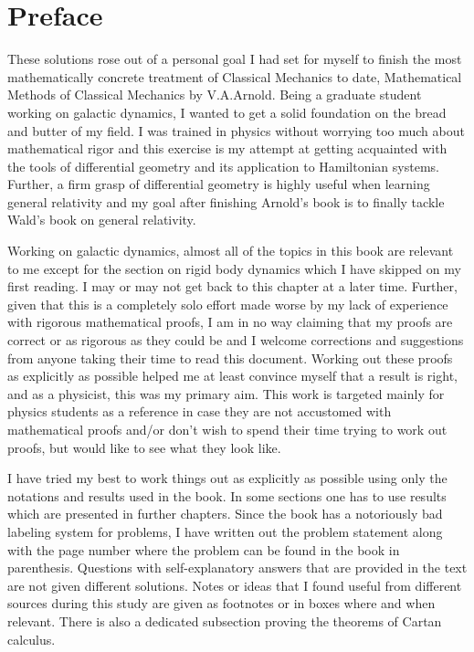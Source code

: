 \chapter*{Preface}
These solutions rose out of a personal goal I had set for myself to finish the most mathematically concrete treatment of Classical Mechanics to date, Mathematical Methods of Classical Mechanics by V.A.Arnold. Being a graduate student working on galactic dynamics, I wanted to get a solid foundation on the bread and butter of my field. I was trained in physics without worrying too much about mathematical rigor and this exercise is my attempt at getting acquainted with the tools of differential geometry and its application to Hamiltonian systems. Further, a firm grasp of differential geometry is highly useful when learning general relativity and my goal after finishing Arnold's book is to finally tackle Wald's book on general relativity.\par
Working on galactic dynamics, almost all of the topics in this book are relevant to me except for the section on rigid body dynamics which I have skipped on my first reading. I may or may not get back to this chapter at a later time. Further, given that this is a completely solo effort made worse by my lack of experience with rigorous mathematical proofs, I am in no way claiming that my proofs are correct or as rigorous as they could be and I welcome corrections and suggestions from anyone taking their time to read this document. Working out these proofs as explicitly as possible helped me at least convince myself that a result is right, and as a physicist, this was my primary aim. This work is targeted mainly for physics students as a reference in case they are not accustomed with mathematical proofs and/or don't wish to spend their time trying to work out proofs, but would like to see what they look like.\par
I have tried my best to work things out as explicitly as possible using only the notations and results used in the book. In some sections one has to use results which are presented in further chapters. Since the book has a notoriously bad labeling system for problems, I have written out the problem statement along with the page number where the problem can be found in the book in parenthesis. Questions with self-explanatory answers that are provided in the text are not given different solutions. Notes or ideas that I found useful from different sources during this study are given as footnotes or in boxes where and when relevant. There is also a dedicated subsection proving the theorems of Cartan calculus. 